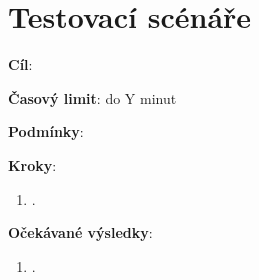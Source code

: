 \chapter{Testovací scénáře}\label{appendix:testovaciScenare}



\vspace{1em}

\textbf{Cíl}: 

\textbf{Časový limit}: do Y minut

\textbf{Podmínky}: 

\textbf{Kroky}:

\begin{enumerate}[leftmargin=1.4cm]
    \item .
\end{enumerate}

\textbf{Očekávané výsledky}:

\begin{enumerate}[leftmargin=1.4cm]
    \item .
\end{enumerate}
